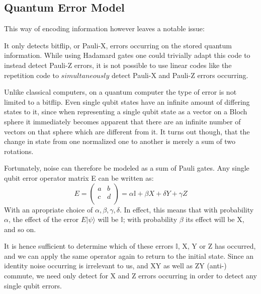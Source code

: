 \subsection{Quantum Error Model}
This way of encoding information however leaves a notable
issue:

It only detects bitflip, or Pauli-X, errors occurring on
the stored quantum information. While using Hadamard gates one
could trivially adapt this code to instead detect Pauli-Z errors,
it is not possible to use linear codes like the repetition code
to $simultaneously$ detect Pauli-X and Pauli-Z errors occurring.

Unlike classical computers, on a quantum computer the type of error
 is not limited
to a bitflip. Even single qubit states have an
infinite amount of differing states to it, since when representing a single
qubit state as a vector on a Bloch sphere it immediately becomes apparent
that there are an infinite number of vectors on that sphere which are different
from it. It turns out though, that the change in state from one normalized
one to another is merely a sum of two rotations.

Fortunately, noise can therefore be modeled as a sum of Pauli gates.
Any single qubit error operator matrix E can be written as:
\begin{equation}
    E =
    \left(
    \begin{array}{cc}
        a & b \\
        c & d \\
    \end{array}
    \right) = 
    \alpha \mathbb{I} + \beta X + \delta Y + \gamma Z
\end{equation}
With an apropriate choice of $\alpha, \beta, \gamma, \delta$.
In effect, this means that with probability $\alpha$, the effect of the
error $E|\psi\rangle$ will be $\mathbb{I}$; with probability $\beta$ its effect
will be X, and so on.

It is hence sufficient to determine which of these errors $\mathbb{I}$, 
X, Y or Z has occurred, and we can apply the same operator again to return to the 
initial state.
Since an identity noise occurring is irrelevant to us, and XY as
well as ZY (anti-) commute, we need only detect for X and Z
errors occurring in order to detect any single qubit errors. 